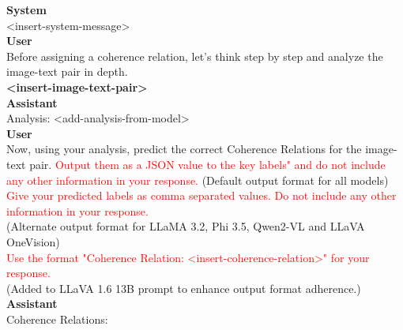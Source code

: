 \begin{figure*}[t]
    \centering
    \begin{tcolorbox}[title={CoT Prompt for CLUE Multi-Label}, colframe = orange!30, colback = orange!10, coltitle = orange!20!black, after skip=0pt, boxsep=5pt, width=\textwidth]
    
    \textbf{System} \\
    <insert-system-message> \\
    
    \textbf{User} \\
    Before assigning a coherence relation, let's think step by step and analyze the image-text pair in depth. \\
        
    \textbf{<insert-image-text-pair>} \\
    
    \textbf{Assistant} \\
    Analysis: <add-analysis-from-model> \\

    \textbf{User} \\
    Now, using your analysis, predict the correct Coherence Relations for the image-text pair. \textcolor{red}{Output them as a JSON value to the key labels" and do not include any other information in your response.} (Default output format for all models) \\

    \textcolor{red}{Give your predicted labels as comma separated values. Do not include any other information in your response.} \\
    (Alternate output format for LLaMA 3.2, Phi 3.5, Qwen2-VL and LLaVA OneVision) \\

    \textcolor{red}{Use the format "Coherence Relation: <insert-coherence-relation>" for your response.} \\
    (Added to LLaVA 1.6 13B prompt to enhance output format adherence.) \\

    \textbf{Assistant} \\
    Coherence Relations:
    
    \end{tcolorbox}
\end{figure*}



